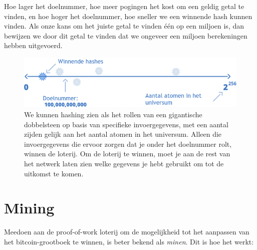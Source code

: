 \documentclass[
  letterpaper,
]{scrbook}
\begin{document}
Hoe lager het doelnummer, hoe meer pogingen het kost om een geldig getal
te vinden, en hoe hoger het doelnummer, hoe sneller we een winnende hash
kunnen vinden. Als onze kans om het juiste getal te vinden één op een
miljoen is, dan bewijzen we door dit getal te vinden dat we ongeveer een
miljoen berekeningen hebben uitgevoerd.

\begin{figure}

{\centering \includegraphics{./images/fig5.png}

}

\caption{\label{fig-fig5}We kunnen hashing zien als het rollen van een
gigantische dobbelsteen op basis van specifieke invoergegevens, met een
aantal zijden gelijk aan het aantal atomen in het universum. Alleen die
invoergegevens die ervoor zorgen dat je onder het doelnummer rolt,
winnen de loterij. Om de loterij te winnen, moet je aan de rest van het
netwerk laten zien welke gegevens je hebt gebruikt om tot de uitkomst te
komen.}

\end{figure}

\hypertarget{mining}{%
\chapter{Mining}\label{mining}}

Meedoen aan de proof-of-work loterij om de mogelijkheid tot het
aanpassen van het bitcoin-grootboek te winnen, is beter bekend als
\emph{minen}. Dit is hoe het werkt:
\end{document}
